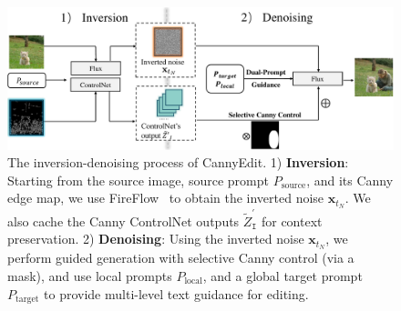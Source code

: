 \documentclass{article}
\begin{document}
\begin{figure}[t]
    \centering
    \includegraphics[width=0.8\linewidth]{figures/framework3.pdf}
    \vspace{-1mm}
    \caption{The inversion-denoising process of CannyEdit. 1) \textbf{Inversion}: Starting from the source image, source prompt \( P_\text{source} \), and its Canny edge map, we use FireFlow~\citep{deng2024fireflow} to obtain the inverted noise \( \mathbf{x}_{t_N} \). We also cache the Canny ControlNet outputs \( \tilde{Z}^{\prime}_{\texttt{I}} \) for context preservation. 2) \textbf{Denoising}: Using the inverted noise \( \mathbf{x}_{t_N} \), we perform guided generation with selective Canny control (via a mask), and use local prompts \( P_\text{local} \), and a global target prompt \( P_\text{target} \) to provide multi-level text guidance for editing.}
    \label{fig:framework}
\end{figure}
\end{document}
